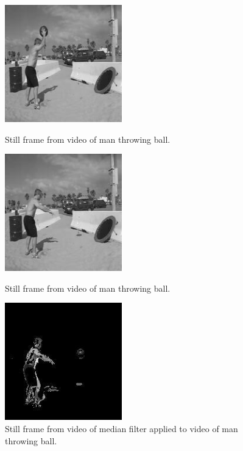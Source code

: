\begin{figure}
\centering
\begin{minipage}{0.33\textwidth}
\centering
\includegraphics[width=2in]{frame_0074.jpg}
\caption{Still frame from video of man throwing ball.}
\label{fig:mana}
\end{minipage}\hfill
\begin{minipage}{0.33\textwidth}
\centering
\includegraphics[width=2in]{frame_0076.jpg}
\caption{Still frame from video of man throwing ball.}
\label{fig:manb}
\end{minipage}
\begin{minipage}{0.33\textwidth}
\centering
\includegraphics[width=2in]{median_man.jpg}
\caption{Still frame from video of median filter applied to video of man throwing ball.}
\end{minipage}
\end{figure}

